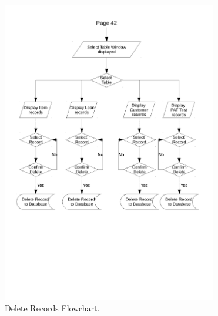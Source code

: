\begin{figure}[H]
    \begin{center}
        \includegraphics[width=355px]{./Design/system_flowcharts/PDFs/delete_records_flowchart.pdf}
    \end{center}
    \caption{Delete Records Flowchart.} \label{fig:print_function_result}
\end{figure}





